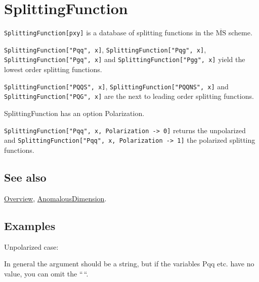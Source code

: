 \documentclass[../FeynCalcManual.tex]{subfiles}
\begin{document}
\hypertarget{splittingfunction}{%
\section{SplittingFunction}\label{splittingfunction}}

\texttt{SplittingFunction[\allowbreak{}pxy]} is a database of splitting
functions in the \(\overline{\textrm{MS}}\) scheme.

\texttt{SplittingFunction[\allowbreak{}"Pqq",\ \allowbreak{}x]},
\texttt{SplittingFunction[\allowbreak{}"Pqg",\ \allowbreak{}x]},
\texttt{SplittingFunction[\allowbreak{}"Pgq",\ \allowbreak{}x]} and
\texttt{SplittingFunction[\allowbreak{}"Pgg",\ \allowbreak{}x]} yield
the lowest order splitting functions.

\texttt{SplittingFunction[\allowbreak{}"PQQS",\ \allowbreak{}x]},
\texttt{SplittingFunction[\allowbreak{}"PQQNS",\ \allowbreak{}x]} and
\texttt{SplittingFunction[\allowbreak{}"PQG",\ \allowbreak{}x]} are the
next to leading order splitting functions.

SplittingFunction has an option Polarization.

\texttt{SplittingFunction[\allowbreak{}"Pqq",\ \allowbreak{}x,\ \allowbreak{}Polarization -> 0]}
returns the unpolarized and
\texttt{SplittingFunction[\allowbreak{}"Pqq",\ \allowbreak{}x,\ \allowbreak{}Polarization -> 1]}
the polarized splitting functions.

\subsection{See also}

\hyperlink{toc}{Overview},
\hyperlink{anomalousdimension}{AnomalousDimension}.

\subsection{Examples}

Unpolarized case:

In general the argument should be a string, but if the variables Pqq
etc. have no value, you can omit the ``\,``.

\begin{Shaded}
\begin{Highlighting}[]
\OperatorTok{[}\OperatorTok{,}\OtherTok{{-}\textgreater{}} \OperatorTok{]} \OperatorTok{[}\OperatorTok{]}\NormalTok{ :\textgreater{} }\OperatorTok{[}\OperatorTok{]}
\end{Highlighting}
\end{Shaded}
\end{document}
